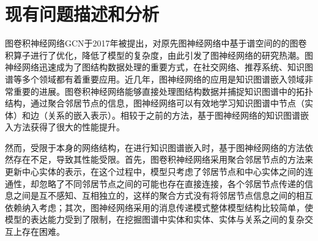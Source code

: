 






\section{现有问题描述和分析}

图卷积神经网络GCN于2017年被提出，对原先图神经网络中基于谱空间的的图卷积算子进行了优化，降低了模型的复杂度，由此引发了图神经网络的研究热潮。图神经网络迅速成为了图结构数据处理的重要方式，在社交网络、推荐系统、知识图谱等多个领域都有着重要应用。近几年，图神经网络的应用是知识图谱嵌入领域非常重要的进展。图卷积神经网络能够直接处理图结构数据并捕捉知识图谱中的拓扑结构，通过聚合邻居节点的信息，图神经网络可以有效地学习知识图谱中节点（实体）和边（关系的嵌入表示）。相较于之前的方法，基于图神经网络的知识图谱嵌入方法获得了很大的性能提升。

然而，受限于本身的网络结构，在进行知识图谱嵌入时，基于图神经网络的方法依然存在不足，导致其性能受限。首先，图卷积神经网络采用聚合邻居节点的方法来更新中心实体的表示，在这个过程中，模型只考虑了邻居节点和中心实体之间的连通性，却忽略了不同邻居节点之间的可能也存在直接连接，各个邻居节点传递的信息之间是互不感知、互相独立的，这样的聚合方式没有将邻居节点信息之间的相互依赖纳入考虑；其次，图神经网络采用的消息传递模式整体模型结构比较简单，使模型的表达能力受到了限制，在挖掘图谱中实体和实体、实体与关系之间的复杂交互上存在困难。

